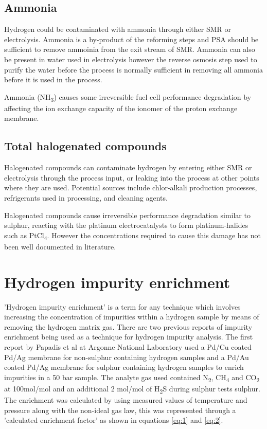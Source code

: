 \subsection*{Ammonia}
Hydrogen could be contaminated with ammonia through either SMR or electrolysis. Ammonia is a by-product of the reforming steps and PSA should be sufficient to remove ammoinia from the exit stream of SMR. Ammonia can also be present in water used in electrolysis however the reverse osmosis step used to purify the water before the process is normally sufficient in removing all ammonia before it is used in the process. \cite{Bacquart2018}

Ammonia (NH\textsubscript{3}) causes some irreversible fuel cell performance degradation by affecting the ion exchange capacity of the ionomer of the proton exchange membrane. \cite{InternationalStandardISO14687-2:20122012}

\subsection*{Total halogenated compounds} 
Halogenated compounds can contaminate hydrogen by entering either SMR or electrolysis through the process input, or leaking into the process at other points where they are used. Potential sources include chlor-alkali production processes, refrigerants used in processing, and cleaning agents. \cite{Bacquart2018}

Halogenated compounds cause irreversible performance degradation similar to sulphur, reacting with the platinum electrocatalysts to form platinum-halides such as PtCl\textsubscript{4}. \cite{Dona2009} However the concentrations required to cause this damage has not been well documented in literature.


\section{Hydrogen impurity enrichment}
'Hydrogen impurity enrichment' is a term for any technique which involves increasing the concentration of impurities within a hydrogen sample by means of removing the hydrogen matrix gas. There are two previous reports of impurity enrichment being used as a technique for hydrogen impurity 
analysis. The first report by Papadis et al at Argonne National Laboratory used a Pd/Cu \cite{Ahmed2010} coated Pd/Ag membrane for non-sulphur containing hydrogen samples and a Pd/Au coated Pd/Ag membrane for sulphur 
containing hydrogen samples to enrich impurities in a 50 bar sample. The analyte gas used contained N\textsubscript{2}, CH\textsubscript{4} and CO\textsubscript{2} at 100\textmu mol/mol and an additional 
 2 \textmu mol/mol of H\textsubscript{2}S during sulphur tests sulphur. 
The enrichment was calculated by using measured values of temperature and pressure along with the non-ideal gas law, this was represented through a 'calculated enrichment factor' as shown in equations \ref{eq:1}
and \ref{eq:2}. 

